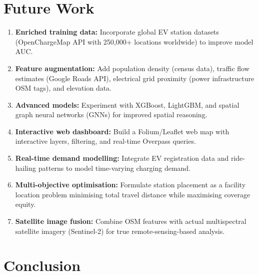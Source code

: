 \documentclass[12pt, a4paper]{article}
\begin{document}
\section{Future Work}

\begin{enumerate}
    \item \textbf{Enriched training data:} Incorporate global EV 
    station datasets (OpenChargeMap API with 250,000+ locations 
    worldwide) to improve model AUC.
    
    \item \textbf{Feature augmentation:} Add population density 
    (census data), traffic flow estimates (Google Roads API), 
    electrical grid proximity (power infrastructure OSM tags), and 
    elevation data.
    
    \item \textbf{Advanced models:} Experiment with XGBoost, 
    LightGBM, and spatial graph neural networks (GNNs) for improved 
    spatial reasoning.
    
    \item \textbf{Interactive web dashboard:} Build a Folium/Leaflet 
    web map with interactive layers, filtering, and real-time Overpass 
    queries.
    
    \item \textbf{Real-time demand modelling:} Integrate EV 
    registration data and ride-hailing patterns to model time-varying 
    charging demand.
    
    \item \textbf{Multi-objective optimisation:} Formulate station 
    placement as a facility location problem minimising total travel 
    distance while maximising coverage equity.
    
    \item \textbf{Satellite image fusion:} Combine OSM features with 
    actual multispectral satellite imagery (Sentinel-2) for true 
    remote-sensing-based analysis.
\end{enumerate}


\section{Conclusion}
\end{document}
